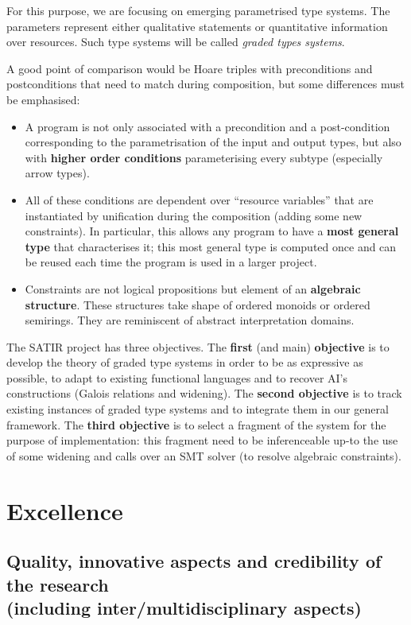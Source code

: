 \documentclass{article}[11pt]
\begin{document}
For this purpose, we are focusing on emerging parametrised type systems. The parameters represent either qualitative statements or quantitative information over resources. Such type systems will be called {\em graded types systems}.

A good point of comparison would be Hoare triples with preconditions and postconditions that need to match during composition, but some differences must be emphasised:
\begin{itemize}
\item A program is not only associated with a precondition and a post-condition corresponding to the parametrisation of the input and output types, but also with {\bf higher order conditions} parameterising every subtype (especially arrow types).
\item All of these conditions are dependent over ``resource variables'' that are instantiated by unification during the composition (adding some new constraints). In particular, this allows any program to have a {\bf most general type} that characterises it; this most general type is computed once and can be reused each time the program is used in a larger project.
\item Constraints are not logical propositions but element of an {\bf algebraic structure}. These structures take shape of ordered monoids or ordered semirings. They are reminiscent of abstract interpretation domains.
\end{itemize}

The SATIR project has three objectives. The {\bf first} (and main) {\bf objective} is to develop the theory of graded type systems in order to be as expressive as possible, to adapt to existing functional languages and to recover AI's constructions (Galois relations and widening). The {\bf second objective} is to track existing instances of graded type systems and to integrate them in our general framework. The {\bf third objective} is to select a fragment of the system for the purpose of implementation: this fragment need to be inferenceable up-to the use of some widening and calls over an SMT solver (to resolve algebraic constraints).

\section{Excellence}
\subsection{Quality, innovative aspects and credibility of the research\\  (including inter/multidisciplinary aspects)}
\end{document}
